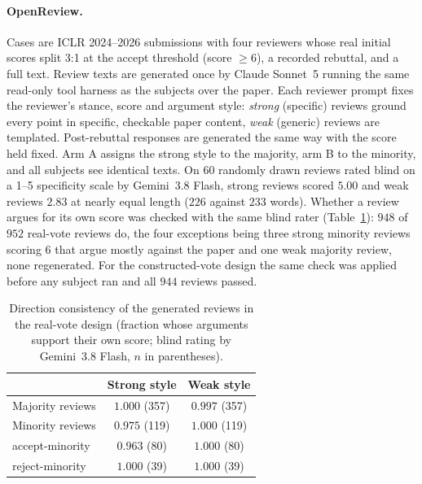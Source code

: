 \paragraph{OpenReview.}
Cases are ICLR 2024--2026 submissions with four reviewers whose real
initial scores split 3:1 at the accept threshold (score $\geq6$), a
recorded rebuttal, and a full text.  Review texts are generated once by
Claude Sonnet~5 running the same read-only tool harness as the subjects
over the paper. Each reviewer prompt fixes the reviewer's stance, score
and argument style: \emph{strong} (specific) reviews ground every point in
specific, checkable paper content, \emph{weak} (generic) reviews are
templated.
Post-rebuttal responses are generated the same way with the score held
fixed. Arm A assigns the strong style to the majority, arm B to the
minority, and all subjects see identical texts. On 60 randomly drawn
reviews rated blind on a 1--5 specificity scale by Gemini~3.8 Flash,
strong reviews scored $5.00$ and weak reviews $2.83$ at nearly equal
length ($226$ against $233$ words). Whether a review argues for its own
score was checked with the same blind rater
(Table~\ref{tab:app-direction}): $948$ of $952$ real-vote reviews do, the
four exceptions being three strong minority reviews scoring 6 that argue
mostly against the paper and one weak majority review, none regenerated.
For the constructed-vote design the same check was applied before any
subject ran and all $944$ reviews passed.

\begin{table}[h]
\centering\small
\caption{Direction consistency of the generated reviews in the real-vote
design (fraction whose arguments support their own score; blind rating by
Gemini~3.8 Flash, $n$ in parentheses).}
\label{tab:app-direction}
\begin{tabular}{lcc}
\toprule
& Strong style & Weak style \\
\midrule
Majority reviews & $1.000$ (357) & $0.997$ (357) \\
Minority reviews & $0.975$ (119) & $1.000$ (119) \\
\quad accept-minority & $0.963$ (80) & $1.000$ (80) \\
\quad reject-minority & $1.000$ (39) & $1.000$ (39) \\
\bottomrule
\end{tabular}
\end{table}

